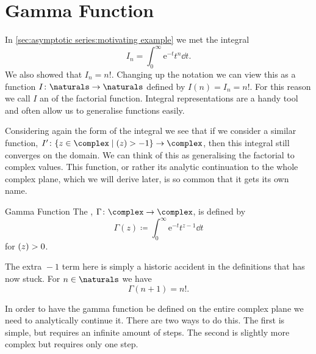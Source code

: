 \documentclass[fleqn]{NotesClass}
\newcommand*{\e}{\mathrm{e}}
\let\Re\relax
\DeclareMathOperator{\Re}{Re}
\begin{document}
    \section{Gamma Function}
    In \cref{sec:asymptotic series:motivating example} we met the integral
    \begin{equation}
        I_n = \int_0^{\infty} \e^{-t}t^{n} \dd{t}.
    \end{equation}
    We also showed that \(I_n = n!\).
    Changing up the notation we can view this as a function \(I\colon\naturals\to\naturals\) defined by \(I(n) = I_n = n!\).
    For this reason we call \(I\) an  of the factorial function.
    Integral representations are a handy tool and often allow us to generalise functions easily.
    
    Considering again the form of the integral we see that if we consider a similar function, \(I' \colon \{z\in\complex\mid\Re(z) > -1\} \to \complex\), then this integral still converges on the domain.
    We can think of this as generalising the factorial to complex values.
    This function, or rather its analytic continuation to the whole complex plane, which we will derive later, is so common that it gets its own name.
    \begin{dfn}{Gamma Function}{}
        The , \(\Gamma\colon\complex\to\complex\), is defined by
        \begin{equation}
            \Gamma(z) \coloneqq \int_{0}^{\infty} \e^{-t}t^{z-1}\dd{t}
        \end{equation}
        for \(\Re(z) > 0\).
    \end{dfn}
    
    The extra \({}-1\) term here is simply a historic accident in the definitions that has now stuck.
    For \(n \in \naturals\) we have
    \begin{equation}
        \Gamma(n + 1) = n!.
    \end{equation}
    
    In order to have the gamma function be defined on the entire complex plane we need to analytically continue it.
    There are two ways to do this.
    The first is simple, but requires an infinite amount of steps.
    The second is slightly more complex but requires only one step.
    
\end{document}
